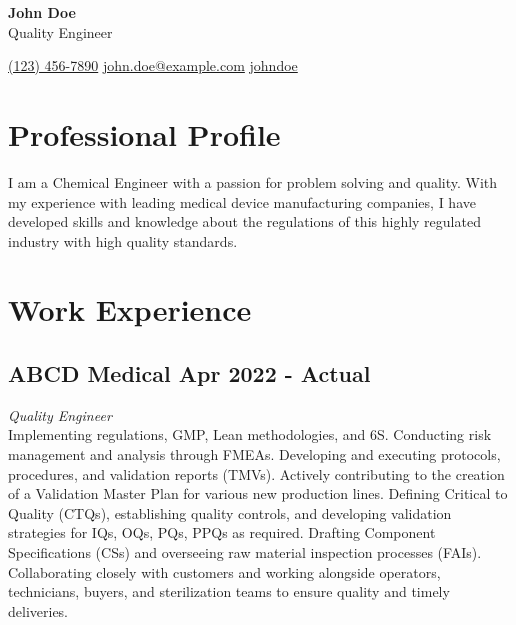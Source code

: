 \documentclass[a4paper,10pt]{article}
\begin{document}
\pagestyle{empty}

\begin{center}
    \textbf{\Huge John Doe} \\
    \vspace{2mm}
     Quality Engineer
\end{center}

\vspace{4mm}
\begin{center}
     \href{https://wa.me/1234567890}{(123) 456-7890} \hspace{2cm}
     \href{mailto:john.doe@example.com}{john.doe@example.com} \hspace{2cm}
     \href{https://www.linkedin.com/in/johndoe/}{johndoe}
\end{center}


\space
\section*{ Professional Profile}
I am a Chemical Engineer with a passion for problem solving and quality. With my experience with leading medical device manufacturing companies, I have developed skills and knowledge about the regulations of this highly regulated industry with high quality standards. 

\section*{ Work Experience}

\subsection*{ABCD Medical \hfill Apr 2022 - Actual}
\textit{ Quality Engineer} \\
Implementing regulations, GMP, Lean methodologies, and 6S.
Conducting risk management and analysis through FMEAs.
Developing and executing protocols, procedures, and validation reports (TMVs).
Actively contributing to the creation of a Validation Master Plan for various new production lines.
Defining Critical to Quality (CTQs), establishing quality controls, and developing validation strategies for IQs, OQs, PQs, PPQs as required.
Drafting Component Specifications (CSs) and overseeing raw material inspection processes (FAIs).
Collaborating closely with customers and working alongside operators, technicians, buyers, and sterilization teams to ensure quality and timely deliveries.
\end{document}
